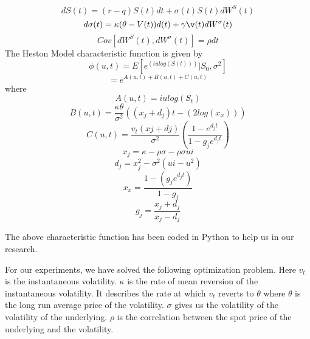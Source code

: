 \documentclass{article}
\begin{document}
\begin{equation}
dS(t) = (r- q)S(t)dt + \sigma(t)S(t)dW^S(t)
\end{equation}
\begin{equation}
d\sigma(t) = \kappa(\theta-V(t))d(t) + \gamma\v(t)dW^\sigma(t)
\end{equation}
\begin{equation}
Cov[dW^S(t), dW^\sigma(t)] = \rho dt
\end{equation}
The Heston Model characteristic function is given by
\begin{equation}
    \phi(u,t) = E[e^{(iulog(S(t)))}|S_{0}, \sigma^2]
\end{equation}
\begin{equation}
    = e^{A(u,t)+B(u,t)+C(u,t)}
\end{equation}
where
\begin{equation}
    A(u,t) = iulog(S_t)
\end{equation}
\begin{equation}
    B(u,t) = \frac{\kappa\theta}{\sigma^2}((x_j+d_j)t - (2log(x_x)) )
\end{equation}
\begin{equation}
    C(u,t) = \frac{v_t(xj+dj)}{\sigma^2} (\frac{1-e^{d_j t}}{ 1-g_je^{d_j t}})
\end{equation}
\begin{equation}
    x_j = \kappa-\rho\sigma-\rho\sigma ui
\end{equation}
\begin{equation}
    d_j = x_{j}^2 - \sigma^2(ui - u^2)
\end{equation}
\begin{equation}
    x_x = \frac{ 1-(g_j e^{d_j t})}{ 1-g_j}
\end{equation}
\begin{equation}
    g_j = \frac{x_j + d_j}{x_j - d_j}
\end{equation}

The above characteristic function has been coded in Python to help us in our research.

For our experiments, we have solved the following optimization problem. Here $v_t$ is the instantaneous volatility. $\kappa$ is the rate of mean reversion of the instantaneous volatility. It describes the rate at which $v_t$ reverts to $\theta$ where $\theta$ is the long run average price of the volatility. $\sigma$ gives us the volatility of the volatility of the underlying. $\rho$ is the correlation between the spot price of the underlying and the volatility. 
\end{document}
